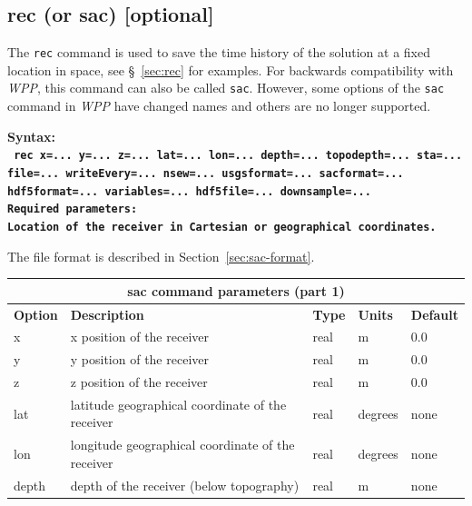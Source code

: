 \documentclass[11pt]{report}
\begin{document}
{\subsection{rec (or sac) [optional]}
The \verb+rec+ command is used to save the time history of the solution at a fixed location in
space, see \S~\ref{sec:rec} for examples. For backwards compatibility with \emph{WPP}, this command
can also be called \verb+sac+. However, some options of the \verb+sac+ command in \emph{WPP} have
changed names and others are no longer supported.
\begin{flushleft}
	\bf
	Syntax:\\
	\tt
	rec x=... y=... z=... lat=... lon=... depth=... topodepth=... sta=... file=... writeEvery=... nsew=... usgsformat=... sacformat=... hdf5format=... variables=... hdf5file=... downsample=...
	\\
	\bf Required parameters:\\
	\rm Location of the receiver in Cartesian or geographical coordinates.
\end{flushleft}
%
The file format is described in Section~\ref{sec:sac-format}.
%
\begin{center}
	\begin{tabular}{|l|p{8cm}|l|l|l|} \hline
		\multicolumn{5}{|c|}{\bf sac command parameters (part 1)}                                               \\ \hline
		\bf{Option} & \bf{Description}                                  & \bf{Type} & \bf{Units} & \bf{Default} \\ \hline \hline
		x           & x position of the receiver                        & real      & m          & 0.0          \\ \hline
		y           & y position of the receiver                        & real      & m          & 0.0          \\ \hline
		z           & z position of the receiver                        & real      & m          & 0.0          \\ \hline
		\hline
		lat         & latitude geographical coordinate of the receiver  & real      & degrees    & none         \\ \hline
		lon         & longitude geographical coordinate of the receiver & real      & degrees    & none         \\ \hline
		depth       & depth of the receiver (below topography)          & real      & m          & none         \\ \hline

\end{tabular}
\end{center}}
\end{document}
